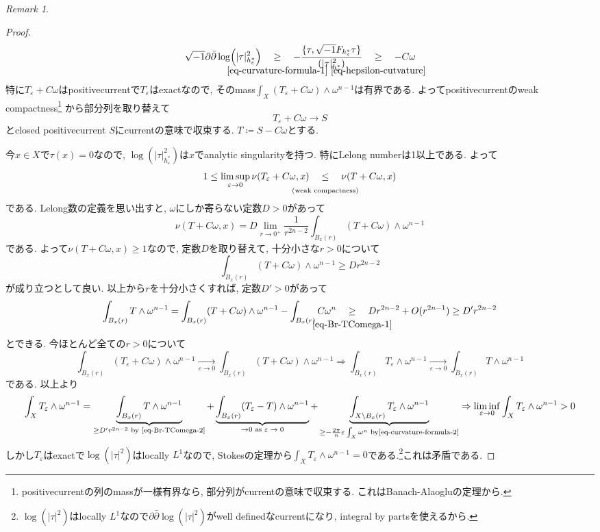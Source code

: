 \documentclass[dvipdfmx,a4paper,11pt]{article} %
\theoremstyle{definition}
\theoremstyle{remark}
\newtheorem{rem}[thm]{Remark}
\numberwithin{equation}{section}
\newcommand{\underalign}[2]{%
  \quad
  \underset{\mathclap{\raisebox{-1.6ex}{\ensuremath{\scriptstyle #1}}}}{#2}
  \quad
}
\begin{document}
\begin{rem}
\begin{proof}
\[\sqrt{-1}\partial \bar\partial \log (\lvert\tau\rvert^{2}_{h_\varepsilon^*})
\underalign{\eqref{eq-curvature-formula-1}}{\geq}
- \frac{\{\tau, \sqrt{-1}F_{h_\varepsilon^*} \tau\}}{(\lvert\tau\rvert^{2}_{h_\varepsilon^*})}
\underalign{\eqref{eq-hepsilon-cutvature}}{\geq}
-C\omega
\]
特に$T_\varepsilon+C\omega$はpositivecurrentで$T_\varepsilon$はexactなので, 
そのmass$\int_{X}(T_\varepsilon+C\omega) \wedge \omega^{n-1}$は有界である. 
よってpositivecurrentのweak compactness\footnote{positivecurrentの列のmassが一様有界なら, 部分列がcurrentの意味で収束する. これはBanach-Alaogluの定理から. }
から部分列を取り替えて
\[
T_\varepsilon+C\omega \longrightarrow S
\]
とclosed positivecurrent $S$にcurrentの意味で収束する.
$T\coloneqq S - C\omega$とする. 

今$x\in X$で$\tau(x)=0$なので, 
$\log (\lvert\tau\rvert^{2}_{h_\varepsilon^*})$は$x$でanalytic singularityを持つ. 特にLelong numberは1以上である. 
よって
\[
1 \leq\limsup_{\varepsilon \to 0}\nu(T_\varepsilon+C\omega , x) 
\underalign{\text{(weak compactness)}}{\leq}
\nu(T+C\omega , x) 
\]
である. Lelong数の定義を思い出すと, $\omega$にしか寄らない定数$D>0$があって
\[
\nu(T+C\omega , x) 
= 
D 
\lim_{r \to 0^+}
\frac{1}{r^{2n-2}}
\int_{B_x(r)}
(T+C\omega) \wedge \omega^{n-1}
\]
である. よって$\nu(T+C\omega , x) \geq 1$なので, 定数$D$を取り替えて, 
十分小さな$r>0$について
\begin{equation}
\label{eq-Br-TComega-1}
\int_{B_x(r)}
(T+C\omega) \wedge \omega^{n-1}
\geq D r^{2n-2}
\end{equation}
が成り立つとして良い. 
以上から$r$を十分小さくすれば, 定数$D'>0$があって
\begin{equation}
\label{eq-Br-TComega-2}
\int_{B_x(r)}
T\wedge \omega^{n-1}
=
\int_{B_x(r)}
(T+C\omega)\wedge \omega^{n-1}
-
\int_{B_x(r)}
C\omega^{n}
\underalign{\eqref{eq-Br-TComega-1}}{\geq} D r^{2n-2} + O(r^{2n-1})
\geq D' r^{2n-2}
\end{equation}
 とできる.
今ほとんど全ての$r>0$について
\[
\int_{B_x(r)}(T_{\varepsilon}+C\omega) \wedge \omega^{n-1}
\underset{\varepsilon \to 0}{\longrightarrow}
\int_{B_x(r)}(T+C\omega) \wedge \omega^{n-1}
\Rightarrow 
\int_{B_x(r)}T_{\varepsilon} \wedge \omega^{n-1}
\underset{\varepsilon \to 0}{\longrightarrow}
\int_{B_x(r)}T\wedge \omega^{n-1}
\]
である. 
以上より
\[
\int_{X}T_{\varepsilon} \wedge \omega^{n-1}
=
\underbrace{\int_{B_x(r)}T\wedge \omega^{n-1}}_{\geq D' r^{2n-2} \text{ by \eqref{eq-Br-TComega-2}}}
+
\underbrace{\int_{B_x(r)}(T_\varepsilon - T)\wedge \omega^{n-1}}_{\to 0 \text{ as $\varepsilon \to 0$}}
+
\underbrace{\int_{X \setminus B_x(r)}T_{\varepsilon} \wedge \omega^{n-1}}
_{\geq -\frac{2 \pi}{n}\varepsilon \int_{X} \omega^{n} \text{ by\eqref{eq-curvature-formula-2}}}
\Rightarrow 
\liminf_{\varepsilon \to 0} \int_{X}T_{\varepsilon} \wedge \omega^{n-1}>0
\]
しかし$T_\varepsilon$はexactで$ \log (\lvert\tau\rvert^{2})$はlocally $L^1$なので, Stokesの定理から$\int_{X}T_{\varepsilon} \wedge \omega^{n-1}=0$である.\footnote{$ \log (\lvert\tau\rvert^{2})$はlocally $L^1$なので$\partial \bar\partial \log (\lvert\tau\rvert^{2})$がwell definedなcurrentになり, integral by partsを使えるから.}これは矛盾である. 
\end{proof}


\end{rem}
\end{document}
